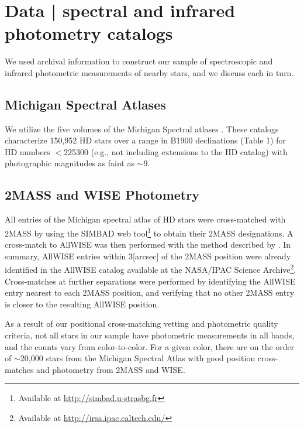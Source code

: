 \chapter{Data | spectral and infrared photometry catalogs}\label{chap:DATA}

We used archival information to construct our sample of spectroscopic and infrared photometric measurements of nearby stars, and we discuss each in turn.

\section{Michigan Spectral Atlases} \label{sec:michigan}

We utilize the five volumes of the Michigan Spectral atlases \citep[]{Houk1975, Houk1978, Houk1982,Houk1988,Houk1999}. These catalogs characterize 150,952 HD stars over a range in B1900 declinations (Table 1) for HD numbers $<$225300 (e.g., not including extensions to the HD catalog) with photographic magnitudes as faint as $\sim$9.



\section{2MASS and WISE Photometry} \label{subsec:2MASS_WISE}

All entries of the Michigan spectral atlas of HD stars were cross-matched with 2MASS \citep{Skrutskie2006} by using the SIMBAD web tool\footnote{Available at \url{http://simbad.u-strasbg.fr}} to obtain their 2MASS designations. A cross-match to AllWISE \cite{ALLWISE,ALLWISE-dwarfs} was then performed with the method described by \cite{BANYAN}. In summary, AllWISE entries within 3[arcsec] of the 2MASS position were already identified in the AllWISE catalog available at the NASA/IPAC Science Archive\footnote{Available at \url{http://irsa.ipac.caltech.edu/}}. Cross-matches at further separations were performed by identifying the AllWISE entry nearest to each 2MASS position, and verifying that no other 2MASS entry is closer to the resulting AllWISE position.

As a result of our positional cross-matching vetting and photometric quality criteria, not all stars in our sample have photometric measurements in all bands, and the counts vary from color-to-color.  For a given color, there are on the order of $\sim$20,000 stars from the Michigan Spectral Atlas with good position cross-matches and photometry from 2MASS and WISE.




